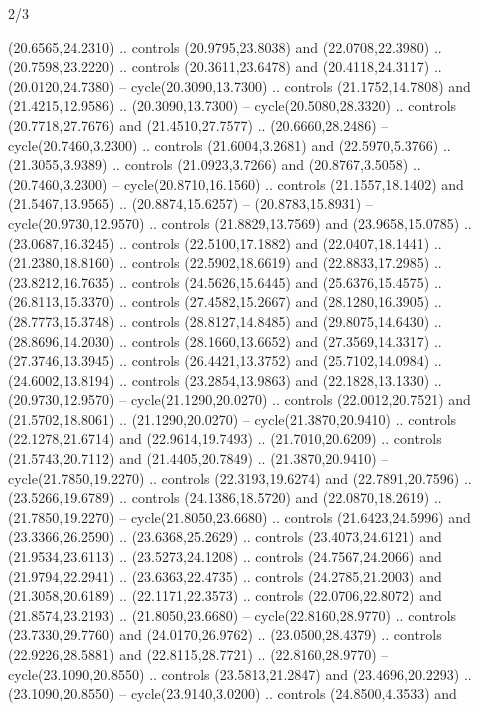 \begin{flagdescription}{2/3}
\begin{scope}[yshift=\flagwidth,scale=\flagwidth/1241.93737]
\begin{scope}[y=-1mm, x=1mm,draw=gold,fill=blue,line join=miter,miter limit=4,line width=1.8\lw]
\begin{scope}[y=1mm, x=1mm, yscale=-1,shift={(573.68mm+\str,145.75)}]
\begin{scope}[scale=1.35,shift={(-9,-3)}]
\begin{scope}[scale=0.55]
\begin{scope}[scale=1.333]
    (20.6565,24.2310) .. controls (20.9795,23.8038) and (22.0708,22.3980) ..
    (20.7598,23.2220) .. controls (20.3611,23.6478) and (20.4118,24.3117) ..
    (20.0120,24.7380) -- cycle(20.3090,13.7300) .. controls (21.1752,14.7808) and
    (21.4215,12.9586) .. (20.3090,13.7300) -- cycle(20.5080,28.3320) .. controls
    (20.7718,27.7676) and (21.4510,27.7577) .. (20.6660,28.2486) --
    cycle(20.7460,3.2300) .. controls (21.6004,3.2681) and (22.5970,5.3766) ..
    (21.3055,3.9389) .. controls (21.0923,3.7266) and (20.8767,3.5058) ..
    (20.7460,3.2300) -- cycle(20.8710,16.1560) .. controls (21.1557,18.1402) and
    (21.5467,13.9565) .. (20.8874,15.6257) -- (20.8783,15.8931) --
    cycle(20.9730,12.9570) .. controls (21.8829,13.7569) and (23.9658,15.0785) ..
    (23.0687,16.3245) .. controls (22.5100,17.1882) and (22.0407,18.1441) ..
    (21.2380,18.8160) .. controls (22.5902,18.6619) and (22.8833,17.2985) ..
    (23.8212,16.7635) .. controls (24.5626,15.6445) and (25.6376,15.4575) ..
    (26.8113,15.3370) .. controls (27.4582,15.2667) and (28.1280,16.3905) ..
    (28.7773,15.3748) .. controls (28.8127,14.8485) and (29.8075,14.6430) ..
    (28.8696,14.2030) .. controls (28.1660,13.6652) and (27.3569,14.3317) ..
    (27.3746,13.3945) .. controls (26.4421,13.3752) and (25.7102,14.0984) ..
    (24.6002,13.8194) .. controls (23.2854,13.9863) and (22.1828,13.1330) ..
    (20.9730,12.9570) -- cycle(21.1290,20.0270) .. controls (22.0012,20.7521) and
    (21.5702,18.8061) .. (21.1290,20.0270) -- cycle(21.3870,20.9410) .. controls
    (22.1278,21.6714) and (22.9614,19.7493) .. (21.7010,20.6209) .. controls
    (21.5743,20.7112) and (21.4405,20.7849) .. (21.3870,20.9410) --
    cycle(21.7850,19.2270) .. controls (22.3193,19.6274) and (22.7891,20.7596) ..
    (23.5266,19.6789) .. controls (24.1386,18.5720) and (22.0870,18.2619) ..
    (21.7850,19.2270) -- cycle(21.8050,23.6680) .. controls (21.6423,24.5996) and
    (23.3366,26.2590) .. (23.6368,25.2629) .. controls (23.4073,24.6121) and
    (21.9534,23.6113) .. (23.5273,24.1208) .. controls (24.7567,24.2066) and
    (21.9794,22.2941) .. (23.6363,22.4735) .. controls (24.2785,21.2003) and
    (21.3058,20.6189) .. (22.1171,22.3573) .. controls (22.0706,22.8072) and
    (21.8574,23.2193) .. (21.8050,23.6680) -- cycle(22.8160,28.9770) .. controls
    (23.7330,29.7760) and (24.0170,26.9762) .. (23.0500,28.4379) .. controls
    (22.9226,28.5881) and (22.8115,28.7721) .. (22.8160,28.9770) --
    cycle(23.1090,20.8550) .. controls (23.5813,21.2847) and (23.4696,20.2293) ..
    (23.1090,20.8550) -- cycle(23.9140,3.0200) .. controls (24.8500,4.3533) and

\end{scope}
\end{scope}
\end{scope}
\end{scope}
\end{scope}
\end{scope}
\end{flagdescription}

